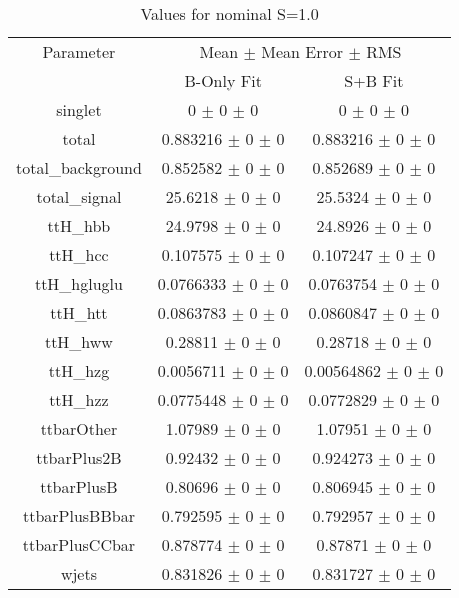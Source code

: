 \begin{table}
\centering
\caption{Values for nominal S=1.0}
\begin{tabular}{ccc}
\toprule
Parameter 	& \multicolumn{2}{c}{Mean $\pm$ Mean Error $\pm$ RMS}\\
 	& B-Only Fit & S+B Fit\\
\midrule
singlet 	& \num{0} $\pm$ \num{0} $\pm$ \num{0} 	& \num{0} $\pm$ \num{0} $\pm$ \num{0}\\
total 	& \num{0.883216} $\pm$ \num{0} $\pm$ \num{0} 	& \num{0.883216} $\pm$ \num{0} $\pm$ \num{0}\\
total\_background 	& \num{0.852582} $\pm$ \num{0} $\pm$ \num{0} 	& \num{0.852689} $\pm$ \num{0} $\pm$ \num{0}\\
total\_signal 	& \num{25.6218} $\pm$ \num{0} $\pm$ \num{0} 	& \num{25.5324} $\pm$ \num{0} $\pm$ \num{0}\\
ttH\_hbb 	& \num{24.9798} $\pm$ \num{0} $\pm$ \num{0} 	& \num{24.8926} $\pm$ \num{0} $\pm$ \num{0}\\
ttH\_hcc 	& \num{0.107575} $\pm$ \num{0} $\pm$ \num{0} 	& \num{0.107247} $\pm$ \num{0} $\pm$ \num{0}\\
ttH\_hgluglu 	& \num{0.0766333} $\pm$ \num{0} $\pm$ \num{0} 	& \num{0.0763754} $\pm$ \num{0} $\pm$ \num{0}\\
ttH\_htt 	& \num{0.0863783} $\pm$ \num{0} $\pm$ \num{0} 	& \num{0.0860847} $\pm$ \num{0} $\pm$ \num{0}\\
ttH\_hww 	& \num{0.28811} $\pm$ \num{0} $\pm$ \num{0} 	& \num{0.28718} $\pm$ \num{0} $\pm$ \num{0}\\
ttH\_hzg 	& \num{0.0056711} $\pm$ \num{0} $\pm$ \num{0} 	& \num{0.00564862} $\pm$ \num{0} $\pm$ \num{0}\\
ttH\_hzz 	& \num{0.0775448} $\pm$ \num{0} $\pm$ \num{0} 	& \num{0.0772829} $\pm$ \num{0} $\pm$ \num{0}\\
ttbarOther 	& \num{1.07989} $\pm$ \num{0} $\pm$ \num{0} 	& \num{1.07951} $\pm$ \num{0} $\pm$ \num{0}\\
ttbarPlus2B 	& \num{0.92432} $\pm$ \num{0} $\pm$ \num{0} 	& \num{0.924273} $\pm$ \num{0} $\pm$ \num{0}\\
ttbarPlusB 	& \num{0.80696} $\pm$ \num{0} $\pm$ \num{0} 	& \num{0.806945} $\pm$ \num{0} $\pm$ \num{0}\\
ttbarPlusBBbar 	& \num{0.792595} $\pm$ \num{0} $\pm$ \num{0} 	& \num{0.792957} $\pm$ \num{0} $\pm$ \num{0}\\
ttbarPlusCCbar 	& \num{0.878774} $\pm$ \num{0} $\pm$ \num{0} 	& \num{0.87871} $\pm$ \num{0} $\pm$ \num{0}\\
wjets 	& \num{0.831826} $\pm$ \num{0} $\pm$ \num{0} 	& \num{0.831727} $\pm$ \num{0} $\pm$ \num{0}\\
\bottomrule
\end{tabular}
\end{table}